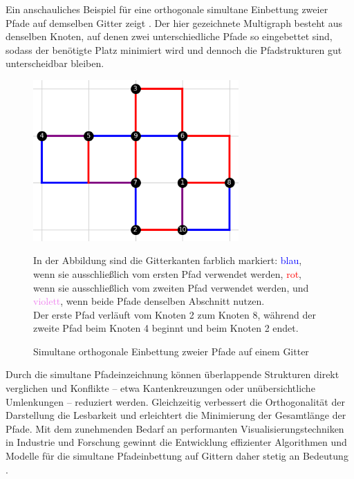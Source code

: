 \documentclass[bachelor, german]{algothesis}
\begin{document}
Ein anschauliches Beispiel für eine orthogonale simultane Einbettung zweier Pfade auf demselben Gitter zeigt . Der hier gezeichnete Multigraph besteht aus denselben Knoten, auf denen zwei unterschiedliche Pfade so eingebettet sind, sodass der benötigte Platz minimiert wird und dennoch die Pfadstrukturen gut unterscheidbar bleiben.
\begin{figure}[H]
    \begin{minipage}{0.5\textwidth}
    \centering
    \includegraphics[width=0.7\textwidth]{figures/Simultaneous.png}
    \caption{Simultane orthogonale Einbettung zweier Pfade auf einem Gitter}
    \label{fig:simultaneous}
    \end{minipage}
    \begin{minipage}{0.5\textwidth}
    \small
        In der Abbildung sind die Gitterkanten farblich markiert: \textcolor{blue}{blau}, wenn sie ausschließlich vom ersten Pfad verwendet werden, \textcolor{red}{rot}, wenn sie ausschließlich vom zweiten Pfad verwendet werden, und \textcolor{violet}{violett}, wenn beide Pfade denselben Abschnitt nutzen. \\
        Der erste Pfad verläuft vom Knoten 2 zum Knoten 8, während der zweite Pfad beim Knoten 4 beginnt und beim Knoten 2 endet.
    \end{minipage}
\end{figure}

Durch die simultane Pfadeinzeichnung können überlappende Strukturen direkt verglichen und Konflikte – etwa Kantenkreuzungen oder unübersichtliche Umlenkungen – reduziert werden. Gleichzeitig verbessert die Orthogonalität der Darstellung die Lesbarkeit und erleichtert die Minimierung der Gesamtlänge der Pfade. Mit dem zunehmenden Bedarf an performanten Visualisierungstechniken in Industrie und Forschung gewinnt die Entwicklung effizienter Algorithmen und Modelle für die simultane Pfadeinbettung auf Gittern daher stetig an Bedeutung \cite{Handbook}.
\end{document}
